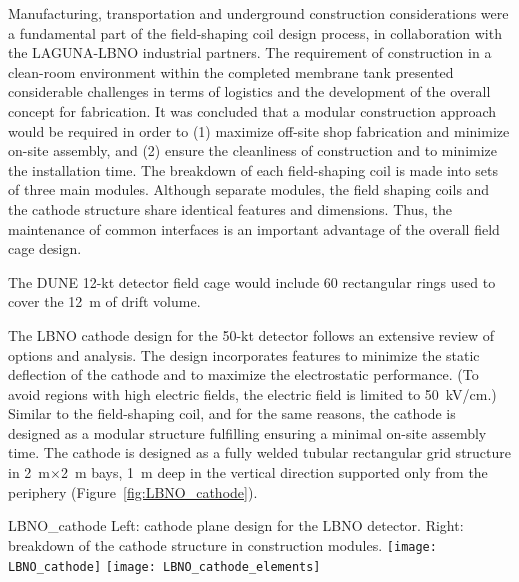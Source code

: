 Manufacturing, transportation and underground construction considerations were a fundamental part of the field-shaping coil design process, in
collaboration with the LAGUNA-LBNO industrial partners. The requirement of construction in a clean-room environment within the completed membrane tank  presented considerable challenges in terms of logistics and the development of the overall concept for fabrication.  It was concluded that a modular construction approach would be required in order to  (1) maximize off-site shop fabrication and minimize on-site assembly,  and (2) ensure the cleanliness of construction and to minimize the installation time. The breakdown of each field-shaping coil is made into sets of three main modules.  Although separate modules, the field shaping coils and the cathode structure share identical features and dimensions.  Thus, the maintenance of common interfaces is an important advantage  of the overall field cage design.
 
The DUNE  12-kt detector field cage would include 60 rectangular rings used to cover the 12~m of drift volume.

The LBNO cathode design for the 50-kt detector follows an extensive review of options and analysis. The design incorporates features to minimize the static deflection of the cathode and to maximize the electrostatic performance. (To avoid regions with high electric fields, the electric field is limited to 50~kV/cm.)  Similar to the field-shaping coil, and for the same reasons, the cathode is designed as a modular structure fulfilling ensuring a minimal on-site assembly time. The cathode is designed as a fully welded tubular rectangular grid structure in 2~m$\times$2~m bays, 1~m deep in the vertical direction supported only from the  periphery (Figure~\ref{fig:LBNO_cathode}).  

\begin{cdrfigure}{LBNO_cathode}
{\small Left: cathode plane design for the LBNO detector. Right: breakdown of 
the cathode structure in construction modules.}
\texttt{[image: LBNO\_cathode]} \hfil
\texttt{[image: LBNO\_cathode\_elements]}
\end{cdrfigure}

